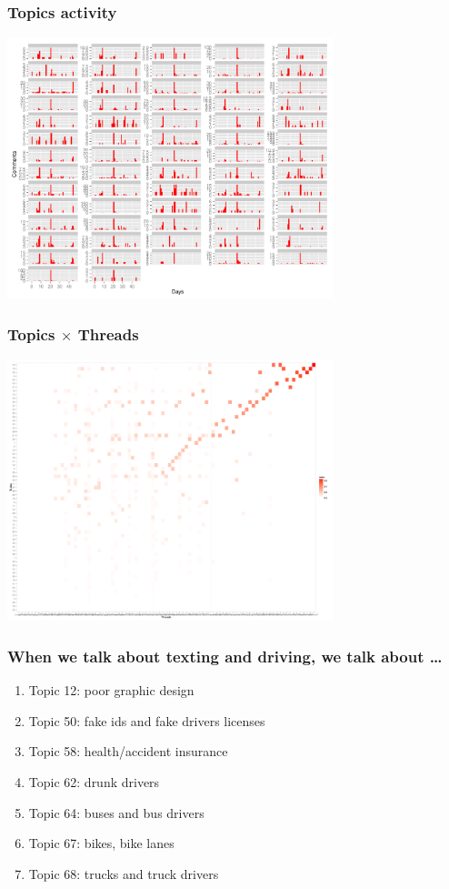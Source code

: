 \documentclass{beamer}
\begin{document}
\begin{frame}\frametitle{Topics activity}
  \begin{center}
    \includegraphics[width=9.5cm]{./imgs/DT_timebycluster.pdf}
  \end{center}
\end{frame}

\begin{frame}\frametitle{Topics $\times$ Threads}
  \begin{center}
    \includegraphics[width=9.5cm]{./imgs/DT_gg_heat.pdf}
  \end{center}
\end{frame}

\begin{frame}\frametitle{When we talk about texting and driving, we talk about \ldots}
\begin{center}
{\Large 
\begin{enumerate}
\item Topic 12: poor graphic design
\item Topic 50: fake ids and fake drivers licenses
\item Topic 58: health/accident insurance
\item Topic 62: drunk drivers
\item Topic 64: buses and bus drivers
\item Topic 67: bikes, bike lanes
\item Topic 68: trucks and truck drivers
\end{enumerate}
}
\end{center}
\end{frame}
\end{document}

